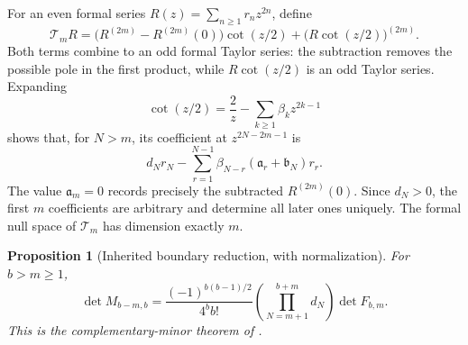 \documentclass[11pt,a4paper]{article}
\numberwithin{equation}{section}
\newtheorem{proposition}[theorem]{Proposition}
\theoremstyle{definition}
\theoremstyle{remark}
\begin{document}
For an even formal series $R(z)=\sum_{n\ge1}r_nz^{2n}$, define
\begin{equation}\label{gb:cot-operator}
 \mathcal T_mR
 =\bigl(R^{(2m)}-R^{(2m)}(0)\bigr)\cot(z/2)
                      +\bigl(R\cot(z/2)\bigr)^{(2m)}.
\end{equation}
Both terms combine to an odd formal Taylor series: the subtraction
removes the possible pole in the first product, while $R\cot(z/2)$
is an odd Taylor series.  Expanding
\[
 \cot(z/2)=\frac2z-\sum_{k\ge1}\beta_kz^{2k-1}
\]
shows that, for $N>m$, its coefficient at $z^{2N-2m-1}$ is
\begin{equation}\label{gb:coefficient}
 d_Nr_N-\sum_{r=1}^{N-1}
      \beta_{N-r}(\mathfrak a_r+\mathfrak b_N)r_r.
\end{equation}
The value $\mathfrak a_m=0$ records precisely the subtracted
$R^{(2m)}(0)$.  Since $d_N>0$, the first $m$ coefficients are
arbitrary and determine all later ones uniquely.  The formal null
space of $\mathcal T_m$ has dimension exactly $m$.

\begin{proposition}[Inherited boundary reduction, with normalization]
\label{gb:bridge}
For $b>m\ge1$,
\begin{equation}\label{gb:bridge-formula}
 \boxed{\displaystyle
 \det M_{b-m,b}
 =\frac{(-1)^{b(b-1)/2}}{4^bb!}
       \left(\prod_{N=m+1}^{b+m}d_N\right)\det F_{b,m}.}
\end{equation}
This is the complementary-minor theorem of
\cite[Theorem~\texttt{gap:complementary}]{repo-gamma}.
\end{proposition}
\end{document}
